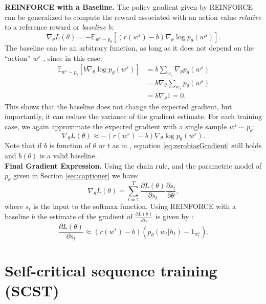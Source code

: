 \documentclass[10pt,twocolumn,letterpaper]{article}
\begin{document}
\noindent \textbf{REINFORCE with a Baseline.} The policy gradient given by REINFORCE can be generalized to compute the reward associated with an action value \emph{relative} to a reference reward or \emph{baseline} $b$:
\begin{equation}
\nabla_{\theta}L(\theta)= - \mathbb{E}_{w^s \sim p_{\theta}} \left[ (r(w^s)- b ) \nabla_{\theta} \log p_{\theta}(w^s)\right].
\end{equation}
The baseline can be an arbitrary function, as long as it does not depend on the ``action''  $w^s$ \cite{Sutton:1998}, since in this case:
\begin{align}
\mathbb{E}_{w^s\sim p_{\theta}} \left[ b  \nabla_{\theta} \log p_{\theta}(w^s)\right]& = b \sum_{w_s} \nabla_{\theta} p_{\theta}(w^s)  \nonumber\\
&=b \nabla_{\theta}  \sum_{w_s}  p_{\theta}(w^s)  \nonumber\\
&=  b  \nabla_{\theta} 1 =0.
\label{eq:zerobiasGradient}
\end{align}
This shows that the baseline does not change the expected gradient, but importantly, it can reduce the variance of the gradient estimate. 
For each training case, we again approximate the expected gradient with a single sample $w^s\sim p_{\theta}$:
\begin{equation}
\nabla_{\theta}L(\theta)\approx- (r(w^s)-b) \nabla_{\theta} \log p_{\theta}(w^s).
\label{eq:zerobiasGradientSample}
\end{equation}
Note that if $b$ is function of $\theta$ or $t$ as in \cite{Ranzato}, equation \eqref{eq:zerobiasGradient} still holds and $b(\theta)$ is a valid baseline. \\

\noindent \textbf{Final Gradient Expression.} Using the chain rule, and the parametric model of $p_{\theta}$ given in Section \ref{sec:captioner} we have: 
$$\nabla_{\theta}L(\theta)=\sum_{t=1}^{T} \frac{\partial L(\theta)}{\partial s_{t}}\frac{\partial s_{t}}{\partial \theta},$$
where $s_{t}$ is the input to the softmax function. Using REINFORCE with a baseline $b$ the estimate of  the gradient of $\frac{\partial L(\theta)}{\partial s_{t}}$ is given by \cite{ZarembaS15}:
\begin{equation}
\frac{\partial L(\theta)}{\partial s_{t}}\approx (r(w^s)-b)(p_{\theta}(w_{t}|h_t)- 1_{w^s_{t}}).
\label{eq:GradientREINFORCE}
\end{equation}


\section{Self-critical sequence training (SCST)}
\end{document}
